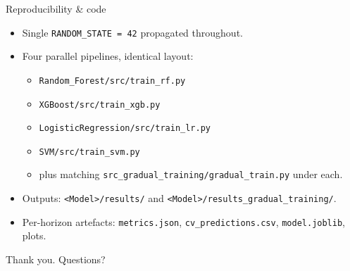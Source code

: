 \documentclass[10pt,aspectratio=169]{beamer}
\begin{document}
\begin{frame}{Reproducibility \& code}
  \begin{itemize}
    \item Single \texttt{RANDOM\_STATE = 42} propagated throughout.
    \item Four parallel pipelines, identical layout:
      \begin{itemize}
        \scriptsize
        \item \texttt{Random\_Forest/src/train\_rf.py}
        \item \texttt{XGBoost/src/train\_xgb.py}
        \item \texttt{LogisticRegression/src/train\_lr.py}
        \item \texttt{SVM/src/train\_svm.py}
        \item plus matching \texttt{src\_gradual\_training/gradual\_train.py}
              under each.
      \end{itemize}
    \item Outputs: \texttt{<Model>/results/} and
          \texttt{<Model>/results\_gradual\_training/}.
    \item Per-horizon artefacts: \texttt{metrics.json},
          \texttt{cv\_predictions.csv}, \texttt{model.joblib}, plots.
  \end{itemize}
  \vspace{1em}
  \begin{center}
    \Large Thank you. Questions?
  \end{center}
\end{frame}
\end{document}
